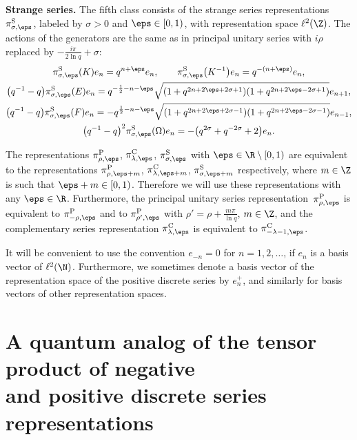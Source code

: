 \textbf{Strange series.} The f\/ifth class consists of the strange series representations $\pi^{\mathrm S}_{\sigma,\eps}$, labeled by $\sigma>0$ and $\eps \in [0,1)$, with representation space $\ell^2(\Z)$. The actions of the generators are the same as in principal unitary series with $i\rho$ replaced by $- \frac{ i\pi}{2\ln q}+\sigma$:
\begin{gather}
\pi^{\mathrm S}_{\sigma,\eps}(K) e_n = q^{n+\eps} e_n, \qquad
\pi^{\mathrm S}_{\sigma,\eps} \big(K^{-1}\big) e_n = q^{-(n+\eps)} e_n,\nonumber\\
\big(q^{-1}-q\big)\pi^{\mathrm S}_{\sigma,\eps}(E) e_n
= q^{-\frac12-n-\eps} \sqrt{(1+q^{2n+2\eps+2\sigma+1})
(1+q^{2n+2\eps-2\sigma+1})} e_{n+1},\nonumber\\
\big(q^{-1}-q\big)\pi^{\mathrm S}_{\sigma,\eps}(F) e_n = -q^{\frac12-n-\eps}
\sqrt{(1+q^{2n+2\eps+2\sigma-1}) (1+q^{2n+2\eps-2\sigma-1})} e_{n-1},\nonumber\\
\big(q^{-1}-q\big)^2 \pi^{\mathrm S}_{\sigma,\eps} (\Omega) e_n =-\big(q^{2\sigma}+q^{-2\sigma} +2\big)e_n.\label{eq:strange}
\end{gather}

The representations $\pi^{\mathrm P}_{\rho,\eps}$, $\pi^{\mathrm C}_{\lambda,\eps}$, $\pi^{\mathrm S}_{\sigma,\eps}$ with $\eps \in \R\setminus [0,1)$ are equivalent to the representations $\pi^{\mathrm P}_{\rho,\eps+m}$,  $\pi^{\mathrm C}_{\lambda,\eps+m}$, $\pi^{\mathrm S}_{\sigma,\eps+m}$ respectively, where $m \in \Z$ is such that $\eps+m \in [0,1)$. Therefore we will use these representations with any $\eps \in \R$. Furthermore, the principal unitary series representation~$\pi_{\rho,\eps}^{\mathrm P}$ is equivalent to $\pi_{-\rho,\eps}^{\mathrm P}$ and to $\pi_{\rho',\eps}^{\mathrm P}$ with $\rho'=\rho+\frac{m\pi}{\ln q}$, $m \in \Z$, and the complementary series representation $\pi_{\lambda,\eps}^{\mathrm{C}}$ is equivalent to $\pi_{-\lambda-1,\eps}^{\mathrm{C}}$.

It will be convenient to use the convention $e_{-n}=0$ for $n=1,2,\ldots$, if $e_n$ is a basis vector of $\ell^2(\N)$. Furthermore, we sometimes denote a basis vector of the representation space of the positive discrete series by $e_n^+$, and similarly for basis vectors of other representation spaces.


\section{A quantum analog of the tensor product of negative\\ and positive discrete series representations} \label{sec:-+}

